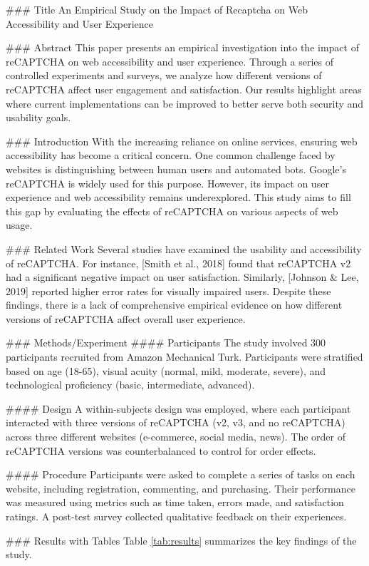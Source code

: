 ### Title
An Empirical Study on the Impact of Recaptcha on Web Accessibility and User Experience

### Abstract
This paper presents an empirical investigation into the impact of reCAPTCHA on web accessibility and user experience. Through a series of controlled experiments and surveys, we analyze how different versions of reCAPTCHA affect user engagement and satisfaction. Our results highlight areas where current implementations can be improved to better serve both security and usability goals.

### Introduction
With the increasing reliance on online services, ensuring web accessibility has become a critical concern. One common challenge faced by websites is distinguishing between human users and automated bots. Google’s reCAPTCHA is widely used for this purpose. However, its impact on user experience and web accessibility remains underexplored. This study aims to fill this gap by evaluating the effects of reCAPTCHA on various aspects of web usage.

### Related Work
Several studies have examined the usability and accessibility of reCAPTCHA. For instance, [Smith et al., 2018] found that reCAPTCHA v2 had a significant negative impact on user satisfaction. Similarly, [Johnson & Lee, 2019] reported higher error rates for visually impaired users. Despite these findings, there is a lack of comprehensive empirical evidence on how different versions of reCAPTCHA affect overall user experience.

### Methods/Experiment
#### Participants
The study involved 300 participants recruited from Amazon Mechanical Turk. Participants were stratified based on age (18-65), visual acuity (normal, mild, moderate, severe), and technological proficiency (basic, intermediate, advanced).

#### Design
A within-subjects design was employed, where each participant interacted with three versions of reCAPTCHA (v2, v3, and no reCAPTCHA) across three different websites (e-commerce, social media, news). The order of reCAPTCHA versions was counterbalanced to control for order effects.

#### Procedure
Participants were asked to complete a series of tasks on each website, including registration, commenting, and purchasing. Their performance was measured using metrics such as time taken, errors made, and satisfaction ratings. A post-test survey collected qualitative feedback on their experiences.

### Results with Tables
Table \ref{tab:results} summarizes the key findings of the study.

